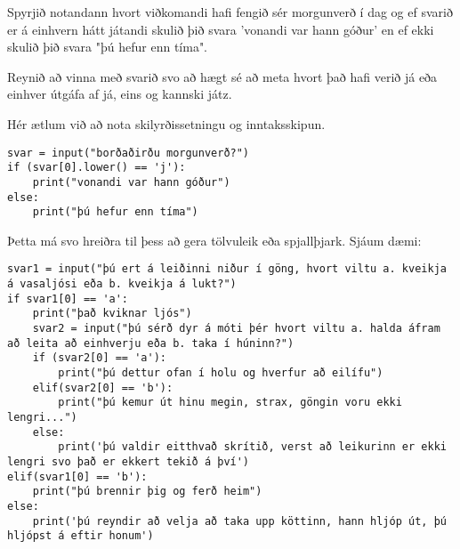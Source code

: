 \begin{exercise}\label{exp5}
Spyrjið notandann hvort viðkomandi hafi fengið sér morgunverð í dag og ef svarið er á einhvern hátt játandi skulið þið svara 'vonandi var hann góður' en ef ekki skulið þið svara "þú hefur enn tíma".

Reynið að vinna með svarið svo að hægt sé að meta hvort það hafi verið já eða einhver útgáfa af já, eins og kannski játz.
\end{exercise}
\begin{Answer}[ref={exp5}]
Hér ætlum við að nota skilyrðissetningu og inntaksskipun.
	\begin{lstlisting}
svar = input("borðaðirðu morgunverð?")
if (svar[0].lower() == 'j'):
	print("vonandi var hann góður")
else:
	print("þú hefur enn tíma")\end{lstlisting}

Þetta má svo hreiðra til þess að gera tölvuleik eða spjallþjark.
Sjáum dæmi:
\begin{lstlisting}
svar1 = input("þú ert á leiðinni niður í göng, hvort viltu a. kveikja á vasaljósi eða b. kveikja á lukt?")
if svar1[0] == 'a':
	print("það kviknar ljós")
	svar2 = input("þú sérð dyr á móti þér hvort viltu a. halda áfram að leita að einhverju eða b. taka í húninn?")
	if (svar2[0] == 'a'):
		print("þú dettur ofan í holu og hverfur að eilífu")
	elif(svar2[0] == 'b'):
		print("þú kemur út hinu megin, strax, göngin voru ekki lengri...")
	else:
		print('þú valdir eitthvað skrítið, verst að leikurinn er ekki lengri svo það er ekkert tekið á því')
elif(svar1[0] == 'b'):
	print("þú brennir þig og ferð heim")
else:
	print('þú reyndir að velja að taka upp köttinn, hann hljóp út, þú hljópst á eftir honum')\end{lstlisting}

\end{Answer}

